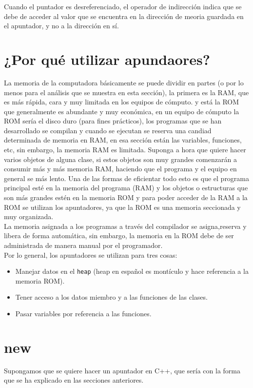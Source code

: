 \documentclass[12pt]{extarticle}
\newcommand{\<}{\langle}
\renewcommand{\>}{\rangle}
\theoremstyle{definition}
\begin{document}
Cuando el puntador es desreferenciado, el operador de indirección indica que se debe de acceder al valor que se encuentra en la dirección de meoria guardada en el apuntador, y no a la dirección en sí.\\

\section{¿Por qué utilizar apundaores?}

La memoria de la computadora básicamente se puede dividir en partes (o por lo menos para el análisis que se muestra en esta sección), la primera es la RAM, que es más rápida, cara y muy limitada en los equipos de cómputo. y está la ROM que generalmente es abundante y muy económica, en un equipo de cómputo la ROM sería el disco duro (para fines prácticos), los programas que se han desarrollado se compilan y cuando se ejecutan se reserva una candiad determinada de memoria en RAM, en esa sección están las variables, funciones, etc, sin embargo, la memoria RAM es limitada. Suponga a hora que quiere hacer varios objetos de alguna clase, si estos objetos son muy grandes comenzarán a consumir más y más memoria RAM, haciendo que el programa y el equipo en general se más lento. Una de las formas de eficientar todo esto es que el programa principal esté en la memoria del programa (RAM) y los objetos o estructuras que son más grandes estén en la memoria ROM y para poder acceder de la RAM a la ROM se utilizan los apuntadores, ya que la ROM es una memoria seccionada y muy organizada.\\

La memoria asignada a los programas a través del compilador se asigna,reserva y libera de forma automática, sin embargo, la memoria en la ROM debe de ser administrada de manera manual por el programador.\\

Por lo general, los apuntadores se utilizan para tres cosas:
\begin{itemize}
	\item Manejar datos en el \verb|heap| (heap en español es montículo y hace referencia a la memoria ROM).
	\item Tener acceso a los datos miembro y a las funciones de las clases. 
	\item Pasar variables por referencia a las funciones.
\end{itemize}

\section{new}
Supongamos que se quiere hacer un apuntador en C++, que sería  con la forma que se ha explicado en las secciones anteriores. 
\end{document}
